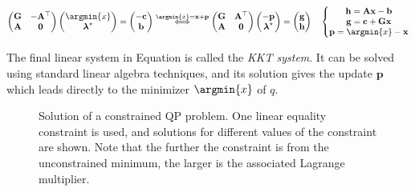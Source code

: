 \begin{equation}
  \label{eq:chap3-qp-kkt}
  \left(\begin{matrix}
    \mathbf{G} & -\mathbf{A}^{\top} \\
    \mathbf{A} & \mathbf{0}
  \end{matrix}\right)
  \left(\begin{matrix}
    \argmin{x} \\
    \boldsymbol{\lambda}^{\star}
  \end{matrix}\right)
  = \left(\begin{matrix}
    -\mathbf{c} \\
    \mathbf{b}
  \end{matrix}\right)  
  \overset{\argmin{x}=\mathbf{x}+\mathbf{p}}\Longleftrightarrow
  \left(\begin{matrix}
    \mathbf{G} & \mathbf{A}^{\top} \\
    \mathbf{A} & \mathbf{0} \\
  \end{matrix}\right)
  \left(\begin{matrix}
    -\mathbf{p} \\
    \boldsymbol{\lambda}^{\star}
  \end{matrix}\right)
  = \left(\begin{matrix}
    \mathbf{g} \\
    \mathbf{h}
  \end{matrix}\right)
  \quad
  \left\{\begin{matrix}
      \mathbf{h} = \mathbf{A}\mathbf{x} - \mathbf{b} \\
      \mathbf{g} = \mathbf{c} + \mathbf{G}\mathbf{x} \\
      \mathbf{p} = \argmin{x} - \mathbf{x}
    \end{matrix}\right.
\end{equation}

The final linear system in Equation  is called
the \emph{KKT system}. It can be solved using standard linear algebra
techniques, and its solution gives the update $\mathbf{p}$ which leads
directly to the minimizer $\argmin{x}$ of $q$.

\begin{figure}
      \caption{Solution of a constrained QP problem. One linear
        equality constraint is used, and solutions for different
        values of the constraint are shown. Note that the further the
        constraint is from the unconstrained minimum, the larger is
        the associated Lagrange multiplier.}
      \label{fig:chap3-qp-equality}
\end{figure}

